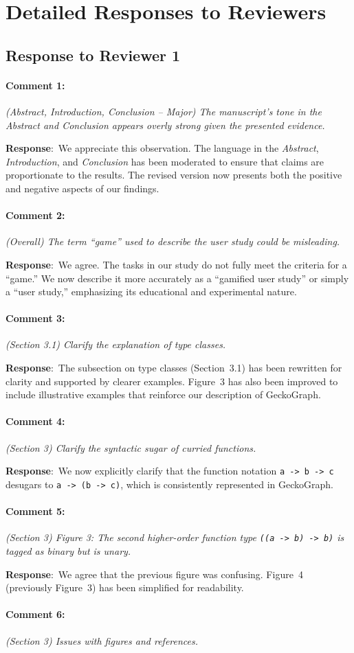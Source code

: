 \documentclass{article}
\newcommand{\pointRaised}[2]{\medskip \noindent 
               \paragraph{#1} \textsl{#2}}
\newcommand{\reply}{\noindent \textbf{Response}:\ }
\begin{document}
\section{Detailed Responses to Reviewers}

\subsection*{Response to Reviewer 1}

\pointRaised{Comment 1:}{(Abstract, Introduction, Conclusion – Major) The manuscript’s tone in the Abstract and Conclusion appears overly strong given the presented evidence.}

\reply We appreciate this observation. The language in the \textit{Abstract}, \textit{Introduction}, and \textit{Conclusion} has been moderated to ensure that claims are proportionate to the results. The revised version now presents both the positive and negative aspects of our findings.

\pointRaised{Comment 2:}{(Overall) The term “game” used to describe the user study could be misleading.}

\reply We agree. The tasks in our study do not fully meet the criteria for a “game.” We now describe it more accurately as a “gamified user study” or simply a “user study,” emphasizing its educational and experimental nature.

\pointRaised{Comment 3:}{(Section 3.1) Clarify the explanation of type classes.}

\reply The subsection on type classes (Section~3.1) has been rewritten for clarity and supported by clearer examples. Figure~3 has also been improved to include illustrative examples that reinforce our description of GeckoGraph.

\pointRaised{Comment 4:}{(Section 3) Clarify the syntactic sugar of curried functions.}

\reply We now explicitly clarify that the function notation \texttt{a -> b -> c} desugars to \texttt{a -> (b -> c)}, which is consistently represented in GeckoGraph.

\pointRaised{Comment 5:}{(Section 3) Figure 3: The second higher-order function type {\tt ((a -> b) -> b)} is tagged as binary but is unary.}

\reply We agree that the previous figure was confusing. Figure~4 (previously Figure~3) has been simplified for readability.

\pointRaised{Comment 6:}{(Section 3) Issues with figures and references.}
\end{document}
